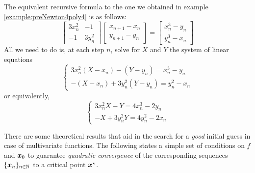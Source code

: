 \begin{example}
The equivalent recursive formula to the one we obtained in example \ref{example:preNewton4poly4} is as follows:
\begin{equation*}
\begin{bmatrix} 3x_n^2 & -1 \\ -1 & 3y_n^2 \end{bmatrix} \begin{bmatrix} x_{n+1}-x_n \\ y_{n+1}-y_n \end{bmatrix} = \begin{bmatrix} x_n^3 - y_n \\ y_n^3 - x_n \end{bmatrix}
\end{equation*}
All we need to do is, at each step $n$, solve for $X$ and $Y$ the system of linear equations
\begin{equation*}
\begin{cases}
3x_n^2 (X-x_n) - (Y-y_n)  = x_n^3 - y_n \\
-(X-x_n) + 3y_n^2 (Y-y_n) = y_n^2 - x_n
\end{cases}
\end{equation*}
or equivalently,
\begin{equation*}
\begin{cases}
3x_n^2 X - Y = 4x_n^3 - 2y_n \\
-X + 3y_n^2 Y = 4y_n^2 - 2x_n
\end{cases}
\end{equation*}
\end{example}

\separator

There are some theoretical results that aid in the search for a \emph{good} initial guess in case of multivariate functions.  The following states a simple set of conditions on $f$ and $\boldsymbol{x}_0$ to guarantee \emph{quadratic convergence} of the corresponding sequences $\{ \boldsymbol{x}_n \}_{n \in \mathbb{N}}$ to a critical point $\boldsymbol{x}^{\star}$.

